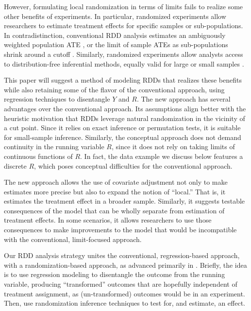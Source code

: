 \documentclass[12pt]{article}
\begin{document}
However, formulating local randomization in terms of limits fails to
realize some other benefits of experiments.
In particular, randomized experiments allow researchers to estimate
treatment effects for specific samples or
sub-populations.
In contradistinction, conventional RDD analysis estimates an
ambiguously weighted population ATE \citep[as
in][]{lee2008randomized}, or the limit of
sample ATEs as sub-populations shrink around a cutoff \citep[as
in][]{hahn2001identification}.
Similarly, randomized experiments allow analysts access to
distribution-free inferential methods, equally valid for large or
small samples
\citep{fisher:1935,pitman1937significance,rosenbaum:2002}.

This paper will suggest a method of modeling RDDs that realizes these
benefits while also retaining some of the flavor of the conventional
approach, using regression techniques to disentangle $Y$ and $R$.
The new approach has several advantages over the conventional approach.
Its assumptions align better with the heuristic motivation that RDDs
leverage natural randomization in the vicinity of a cut point.
Since it relies on exact inference or permutation tests, it is
suitable for small-sample inference.
Similarly, the conceptual approach does not demand continuity in the
running variable $R$, since it does not rely on taking limits of
continuous functions of $R$.
In fact, the data example we discuss below features a discrete $R$,
which poses conceptual difficulties for the conventional approach.

The new approach allows the use of covariate adjustment not only to make
estimates more precise but also to expand the notion of ``local.''
That is, it estimates the treatment effect in a broader sample.
Similarly, it suggests testable consequences of the model that can be
wholly separate from estimation of treatment effects.
In some scenarios, it allows researchers to use those consequences to
make improvements to the model that would be incompatible with the
conventional, limit-focused approach.

Our RDD analysis strategy unites the conventional, regression-based
approach, with a randomization-based approach, as advanced primarily
in \citet{rocio}.
Briefly, the idea is to use regression modeling to disentangle the
outcome from the running variable, producing ``transformed'' outcomes
that are hopefully independent of treatment assignment, as
(un-transformed) outcomes would be in an experiment.
Then, use randomization inference techniques to test for, and
estimate, an effect.
\end{document}
